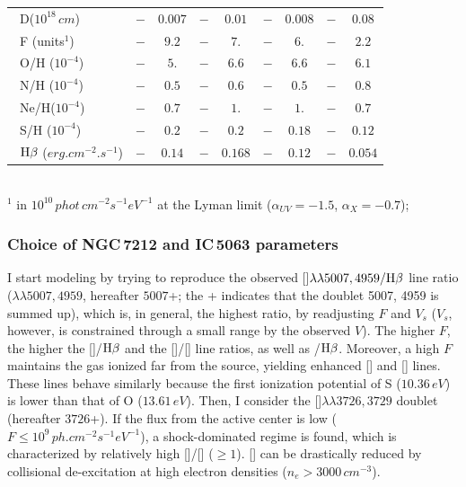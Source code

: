 \documentclass[../main.tex]{subfiles}
\begin{document}
\begin{table}
\begin{tabular}{lcccccccc}
\ D($10^{18}\,\si{cm}$)      &$-      $&$ 0.007$&$-    $&$0.01  $&$-     $&$0.008 $&$-     $&$0.08  $\\            
\ F (units$^1$)       &$-      $&$ 9.2  $&$-    $&$7.    $&$-     $&$6.    $&$-    $&$2.2     $\\            
\ O/H ($10^{-4}$)     &$-      $&$ 5.   $&$-    $&$6.6   $&$-     $&$6.6   $&$-     $&$6.1     $\\            
\ N/H ($10^{-4}$)     &$-      $&$ 0.5  $&$-    $&$0.6   $&$-     $&$0.5   $&$-     $&$0.8     $\\            
\ Ne/H($10^{-4}$)     &$-      $&$ 0.7  $&$-    $&$1.    $&$-     $&$1.    $&$-     $&$0.7    $\\            
\ S/H ($10^{-4}$)     &$-      $&$ 0.2  $&$-    $&$0.2   $&$-     $&$0.18  $&$-     $&$0.12    $\\            
\ $\rm H\beta$ ($\si{erg.cm^{-2}.s^{-1}}$)          &$-      $&$0.14  $&$-    $&$0.168 $&$-     $&$0.12  $&$-     $&$0.054   $\\            
\hline
\end{tabular}
\\
$^1$ in $10^{10}\,\si{phot\,cm^{-2} s^{-1} eV^{-1}}$ at the Lyman limit
(${\alpha}_{UV}=-1.5$, ${\alpha}_X=-0.7$);

\end{table}

\subsubsection{Choice of  NGC\,7212 and IC\,5063 parameters}
\label{sec:parameters}

I start modeling by trying to reproduce the observed []$\lambda\lambda5007,4959/\rm H\beta$ line ratio ($\lambda\lambda5007,4959$, hereafter $5007$+; the + indicates that the doublet 5007, 4959 is summed up), which is, in general, the highest  ratio, by readjusting $F$ and $V_s$ ($V_s$, however, is constrained through a small range by the observed $V$). 
The higher $F$, the higher the []/$\rm H\beta$ and the []/[] line ratios, as well as /$\rm H\beta$. 
Moreover, a high $F$ maintains the gas ionized far from the source, yielding enhanced [] and [] lines. 
These lines behave similarly because the first ionization potential of S ($10.36\,\si{ eV}$) is lower than that of O ($13.61\,\si{ eV}$).
Then, I consider the []$\lambda\lambda3726,3729$ doublet (hereafter $3726$+). 
If the flux from the active center is low ($F \leq 10^9\,\si{ph.cm^{-2} s^{-1} eV^{-1}}$), a shock-dominated regime is found, which is characterized by relatively high []/[] ($\geq 1$). 
[] can be drastically reduced by collisional de-excitation at high electron densities ($n_e >  3000\,\si{cm^{-3}}$).
\end{document}
